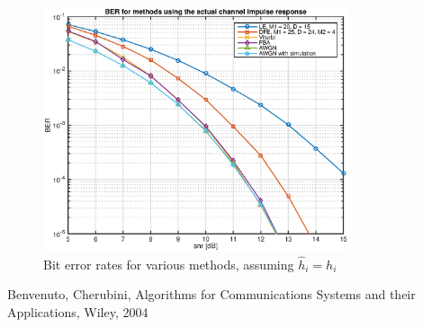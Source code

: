 \documentclass[10pt]{article}
\begin{document}
\begin{figure}[h!]
	\centering
	\includegraphics[width=0.8\textwidth]{BER_real_channel}
	\caption{Bit error rates for various methods, assuming $\hat{h}_i = h_i$}
	\label{fig:BER_real}
\end{figure}

\begin{thebibliography}{10}

Benvenuto, Cherubini, Algorithms for Communications Systems and their Applications, Wiley, 2004

\end{thebibliography}
\end{document}
